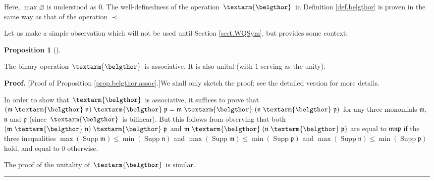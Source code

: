 \documentclass[numbers=enddot,12pt,final,onecolumn,notitlepage,abstracton]{scrartcl}%
\theoremstyle{definition}
\newtheorem{prop}[theo]{Proposition}
\newenvironment{proposition}[1][]
{\begin{prop}[#1]\begin{leftbar}}
{\end{leftbar}\end{prop}}
\newenvironment{proof}[1][Proof]{\noindent\textbf{#1.} }{\ \rule{0.5em}{0.5em}}
\newenvironment{vershort}{}{}
\newcommand{\bel}{\left. \textarm{\belgthor} \right.}
\begin{document}
Here, $\max\varnothing$ is understood as $0$. The well-definedness of the
operation $\bel $ in Definition \ref{def.belgthor} is proven in the same way
as that of the operation $\left.  \prec\right.  $.

Let us make a simple observation which will not be used until Section
\ref{sect.WQSym}, but provides some context:

\begin{proposition}
\label{prop.belgthor.assoc}The binary operation $\bel $ is associative. It is
also unital (with $1$ serving as the unity).
\end{proposition}

\begin{vershort}
\begin{proof}
[Proof of Proposition \ref{prop.belgthor.assoc}.]We shall only sketch the
proof; see the detailed version for more details.

In order to show that $\bel $ is associative, it suffices to prove that
$\left(  \mathfrak{m} \bel \mathfrak{n}\right)  \bel \mathfrak{p}=\mathfrak{m}
\bel \left(  \mathfrak{n} \bel \mathfrak{p}\right)  $ for any three monomials
$\mathfrak{m}$, $\mathfrak{n}$ and $\mathfrak{p}$ (since $\bel $ is bilinear).
But this follows from observing that both $\left(  \mathfrak{m}
\bel \mathfrak{n}\right)  \bel \mathfrak{p}$ and $\mathfrak{m} \bel \left(
\mathfrak{n} \bel \mathfrak{p}\right)  $ are equal to $\mathfrak{mnp}$ if the
three inequalities $\max\left(  \operatorname*{Supp}\mathfrak{m}\right)
\leq\min\left(  \operatorname*{Supp}\mathfrak{n}\right)  $ and $\max\left(
\operatorname*{Supp}\mathfrak{m}\right)  \leq\min\left(  \operatorname*{Supp}%
\mathfrak{p}\right)  $ and $\max\left(  \operatorname*{Supp}\mathfrak{n}%
\right)  \leq\min\left(  \operatorname*{Supp}\mathfrak{p}\right)  $ hold, and
equal to $0$ otherwise.

The proof of the unitality of $\bel $ is similar.
\end{proof}
\end{vershort}
\end{document}
